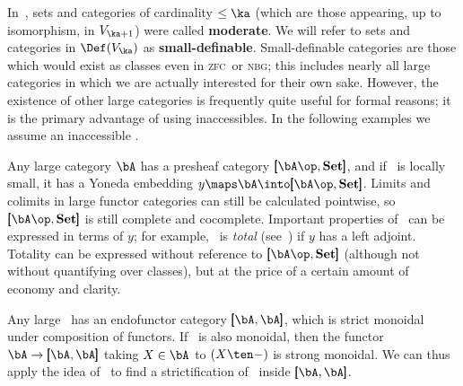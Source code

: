 \documentclass{amsart}
\newcommand{\Set}{\ensuremath{\mathbf{Set}}}
\def\zfc{\textsc{zfc}}
\def\nbg{\textsc{nbg}}
\begin{document}
In~\cite{street:topos}, sets and categories of cardinality $\le \ka$
(which are those appearing, up to isomorphism, in $V_{\ka+1}$) were
called \textbf{moderate}.  We will refer to sets and categories in
$\Def(V_{\ka})$ as \textbf{small-definable}.  Small-definable
categories are those which would exist as classes even in \zfc\ or \nbg;
this includes nearly all large categories in which we are actually
interested for their own sake.  However, the existence of other large
categories is frequently quite useful for formal reasons; it is the
primary advantage of using inaccessibles.  In the following examples
we assume an inaccessible \ka.

\begin{eg}
  Any large category $\bA$ has a presheaf category
  $\pmb[{\bA\op},\Set\pmb]$, and if \bA\ is locally small, it has a
  Yoneda embedding $y\maps \bA\into \pmb[{\bA\op},\Set\pmb]$.  Limits
  and colimits in large functor categories can still be calculated
  pointwise, so $\pmb[{\bA\op},\Set\pmb]$ is still complete and
  cocomplete.  Important properties of \bA\ can be expressed in terms
  of $y$; for example, \bA\ is \emph{total}
  (see~\cite{kelly:totality}) if $y$ has a left adjoint.  Totality can
  be expressed without reference to $\pmb[{\bA\op},\Set\pmb]$
  (although not without quantifying over classes), but at the price of
  a certain amount of economy and clarity.
\end{eg}

\begin{eg}
  Any large \bA\ has an endofunctor category $\pmb[\bA,\bA\pmb]$,
  which is strict monoidal under composition of functors.  If \bA\ is
  also monoidal, then the functor $\bA\to \pmb[\bA,\bA\pmb]$ taking
  $X\in\bA$ to $(X\ten -)$ is strong monoidal.  We can thus apply the
  idea of~\cite[XI.3 Ex.~3]{maclane} to find a strictification of \bA\
  inside $\pmb[\bA,\bA\pmb]$.
\end{eg}

\end{document}
